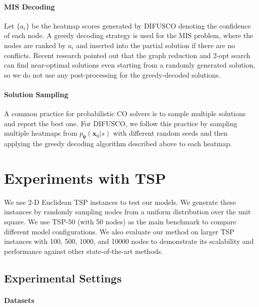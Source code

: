 \documentclass{article}
\theoremstyle{plain}
\theoremstyle{definition}
\theoremstyle{remark}
\newcommand{\method}{DIFUSCO}
\begin{document}
\paragraph{MIS Decoding}
Let $\{a_{i}\}$ be the heatmap scores generated by \method{} denoting the confidence of each node. A greedy decoding strategy is used for the MIS problem, where the nodes are ranked by $a_i$ and inserted into the partial solution if there are no conflicts. Recent research \citep{other2022whats} pointed out that the graph reduction and 2-opt search \citep{andrade2012fast} can find near-optimal solutions even starting from a randomly generated solution, so we do not use any post-processing for the greedy-decoded solutions.

\paragraph{Solution Sampling}


A common practice for probabilistic CO solvers \citep{19iclr-am} is to sample multiple solutions and report the best one. For \method, we follow this practice by sampling multiple heatmaps from $p_{\boldsymbol{\theta}}(\mathbf{x}_0 | s)$ with different random seeds and then applying the greedy decoding algorithm described above to each heatmap.







\section{Experiments with TSP} \label{sec:tsp}

We use 2-D Euclidean TSP instances to test our models. We generate these instances by randomly sampling nodes from a uniform distribution over the unit square. We use TSP-50 (with 50 nodes) as the main benchmark to compare different model configurations. We also evaluate our method on larger TSP instances with 100, 500, 1000, and 10000 nodes to demonstrate its scalability and performance against other state-of-the-art methods.

\subsection{Experimental Settings} \label{sec:tsp_exp_setting}

\paragraph{Datasets} 
\end{document}
